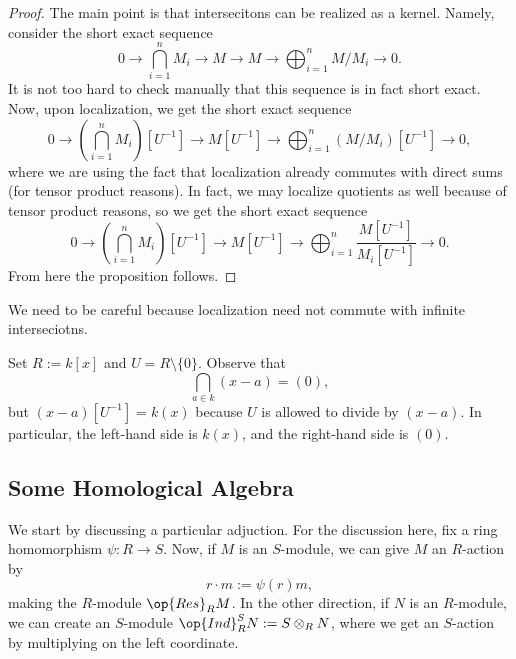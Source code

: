\begin{proof}
	The main point is that intersecitons can be realized as a kernel. Namely, consider the short exact sequence
	\[0\to\bigcap_{i=1}^nM_i\to M\to M\to\bigoplus_{i=1}^nM/M_i\to 0.\]
	It is not too hard to check manually that this sequence is in fact short exact. Now, upon localization, we get the short exact sequence
	\[0\to\left(\bigcap_{i=1}^nM_i\right)\left[U^{-1}\right]\to M\left[U^{-1}\right]\to\bigoplus_{i=1}^n(M/M_i)\left[U^{-1}\right]\to0,\]
	where we are using the fact that localization already commutes with direct sums (for tensor product reasons). In fact, we may localize quotients as well because of tensor product reasons, so we get the short exact sequence
	\[0\to\left(\bigcap_{i=1}^nM_i\right)\left[U^{-1}\right]\to M\left[U^{-1}\right]\to\bigoplus_{i=1}^n\frac{M\left[U^{-1}\right]}{M_i\left[U^{-1}\right]}\to0.\]
	From here the proposition follows.
\end{proof}
We need to be careful because localization need not commute with infinite interseciotns.
\begin{example}
	Set $R:=k[x]$ and $U=R\setminus\{0\}$. Observe that
	\[\bigcap_{a\in k}(x-a)=(0),\]
	but $(x-a)\left[U^{-1}\right]=k(x)$ because $U$ is allowed to divide by $(x-a)$. In particular, the left-hand side is $k(x)$, and the right-hand side is $(0)$.
\end{example}

\subsection{Some Homological Algebra}
We start by discussing a particular adjuction. For the discussion here, fix a ring homomorphism $\psi:R\to S$. Now, if $M$ is an $S$-module, we can give $M$ an $R$-action by
\[r\cdot m:=\psi(r)m,\]
making the $R$-module $\op{Res}_RM$. In the other direction, if $N$ is an $R$-module, we can create an $S$-module $\op{Ind}_R^SN:=S\otimes_RN$, where we get an $S$-action by multiplying on the left coordinate.

